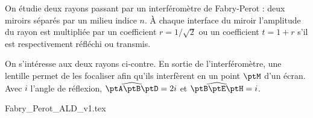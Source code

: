                                 \initialisationPartieGauche %
On étudie deux rayons passant par un interféromètre de Fabry-Perot : deux miroirs séparés par un milieu indice $n$. À chaque interface du miroir l'amplitude du rayon est multipliée par un coefficient $r=1/\sqrt{2}$ ou un coefficient $t=1+r$ s'il est respectivement réfléchi ou transmis.

On s'intéresse aux deux rayons ci-contre. En sortie de l'interféromètre, une lentille permet de les focaliser afin qu'ils interfèrent en un point $\ptM$ d'un écran. Avec $i$ l'angle de réflexion, $\widehat{\ptA \ptB \ptD}=2i$ et $\widehat{\ptB \ptE \ptH}=i$.

                                \initialisationPartieDroite %
	\begin{center}
		{Fabry_Perot_ALD_v1.tex}
	\end{center}
                               \finalisationDuPartageDePage %

\debutEntrainement

\clearpage


